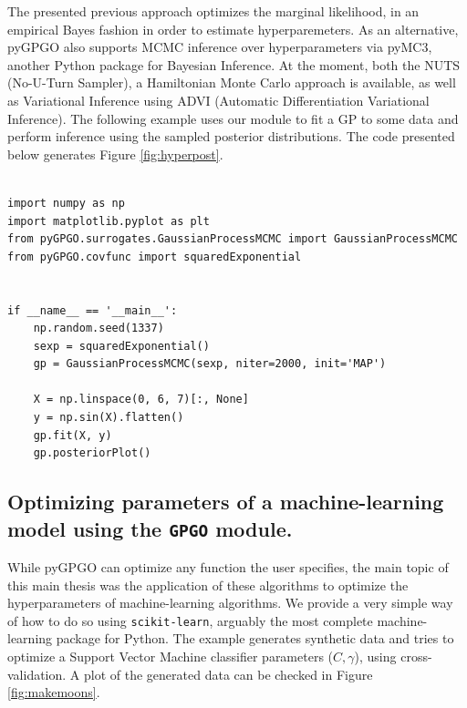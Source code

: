 \documentclass[10pt,a4paper,twoside]{book}
\begin{document}
The presented previous approach optimizes the marginal likelihood, in an empirical Bayes fashion in order to estimate hyperparemeters. As an alternative, pyGPGO also supports MCMC inference over hyperparameters via pyMC3, another Python package for Bayesian Inference. At the moment, both the NUTS \cite{Hoffman2014} (No-U-Turn Sampler), a Hamiltonian Monte Carlo approach is available, as well as Variational Inference using ADVI \cite{Kucukelbir2016} (Automatic Differentiation Variational Inference). The following example uses our module to fit a GP to some data and perform inference using the sampled posterior distributions. The code presented below generates Figure \ref{fig:hyperpost}.

\begin{verbatim}
               
import numpy as np
import matplotlib.pyplot as plt
from pyGPGO.surrogates.GaussianProcessMCMC import GaussianProcessMCMC
from pyGPGO.covfunc import squaredExponential


if __name__ == '__main__':
    np.random.seed(1337)
    sexp = squaredExponential()
    gp = GaussianProcessMCMC(sexp, niter=2000, init='MAP')

    X = np.linspace(0, 6, 7)[:, None]
    y = np.sin(X).flatten()
    gp.fit(X, y)
    gp.posteriorPlot()               
\end{verbatim}


\subsection{Optimizing parameters of a machine-learning model using the \texttt{GPGO} module.}

While pyGPGO can optimize any function the user specifies, the main topic of this main thesis was the application of these algorithms to optimize the hyperparameters of machine-learning algorithms. We provide a very simple way of how to do so using \texttt{scikit-learn}, arguably the most complete machine-learning package for Python. The example generates synthetic data and tries to optimize a Support Vector Machine classifier parameters ($C, \gamma$), using cross-validation. A plot of the generated data can be checked in Figure \ref{fig:makemoons}.\\
\end{document}
